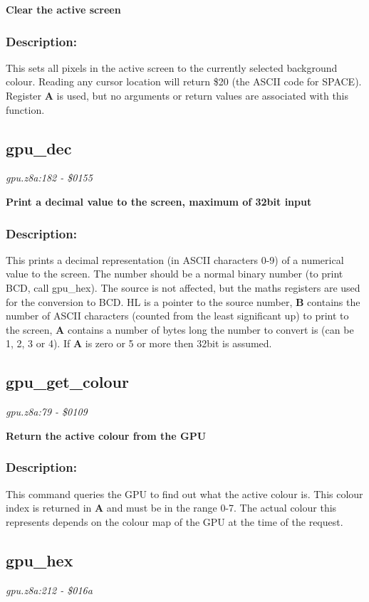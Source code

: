 \noindent
\textbf{Clear the active screen}

\subsubsection{Description:}
 This sets all pixels in the active screen to the currently selected background colour.  Reading any cursor location will return \$20 (the ASCII code for SPACE).  Register \textbf{A} is used, but no arguments or return values are associated with this function.

\subsection{gpu\_dec}
\textit{gpu.z8a:182 - \$0155}

\noindent
\textbf{Print a decimal value to the screen, maximum of 32bit input}

\subsubsection{Description:}
 This prints a decimal representation (in ASCII characters 0-9) of a numerical value to the screen.  The number should be a normal binary number (to print BCD, call gpu\_hex).  The source is not affected, but the maths registers are used for the conversion to BCD.  HL is a pointer to the source number, \textbf{B} contains the number of ASCII characters (counted from the least significant up) to print to the screen, \textbf{A} contains a number of bytes long the number to convert is (can be 1, 2, 3 or 4).  If \textbf{A} is zero or 5 or more then 32bit is assumed.

\subsection{gpu\_get\_colour}
\textit{gpu.z8a:79 - \$0109}

\noindent
\textbf{Return the active colour from the GPU}

\subsubsection{Description:}
 This command queries the GPU to find out what the active colour is.  This colour index is returned in \textbf{A} and must be in the range 0-7.  The actual colour this represents depends on the colour map of the GPU at the time of the request.

\subsection{gpu\_hex}
\textit{gpu.z8a:212 - \$016a}

